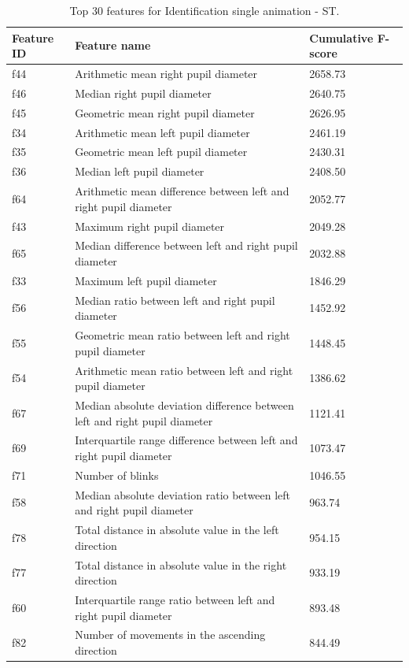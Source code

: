 \documentclass[12pt]{report}
\begin{document}
\begin{table}[htbp]
\centering
\scriptsize
\setlength{\tabcolsep}{3pt}
\caption{Top 30 features for Identification single animation - ST.}
\label{tab:top30_id_s_st}
\begin{tabular}{lll}
\toprule
\textbf{Feature ID} & \textbf{Feature name} & \textbf{Cumulative F-score} \\
\midrule
f44 & Arithmetic mean right pupil diameter & 2658.73 \\
f46 & Median right pupil diameter & 2640.75 \\
f45 & Geometric mean right pupil diameter & 2626.95 \\
f34 & Arithmetic mean left pupil diameter & 2461.19 \\
f35 & Geometric mean left pupil diameter & 2430.31 \\
f36 & Median left pupil diameter & 2408.50 \\
f64 & Arithmetic mean difference between left and right pupil diameter & 2052.77 \\
f43 & Maximum right pupil diameter & 2049.28 \\
f65 & Median difference between left and right pupil diameter & 2032.88 \\
f33 & Maximum left pupil diameter & 1846.29 \\
f56 & Median ratio between left and right pupil diameter & 1452.92 \\
f55 & Geometric mean ratio between left and right pupil diameter & 1448.45 \\
f54 & Arithmetic mean ratio between left and right pupil diameter & 1386.62 \\
f67 & Median absolute deviation difference between left and right pupil diameter & 1121.41 \\
f69 & Interquartile range difference between left and right pupil diameter & 1073.47 \\
f71 & Number of blinks & 1046.55 \\
f58 & Median absolute deviation ratio between left and right pupil diameter & 963.74 \\
f78 & Total distance in absolute value in the left direction & 954.15 \\
f77 & Total distance in absolute value in the right direction & 933.19 \\
f60 & Interquartile range ratio between left and right pupil diameter & 893.48 \\
f82 & Number of movements in the ascending direction & 844.49 \\

\end{tabular}
\end{table}
\end{document}
